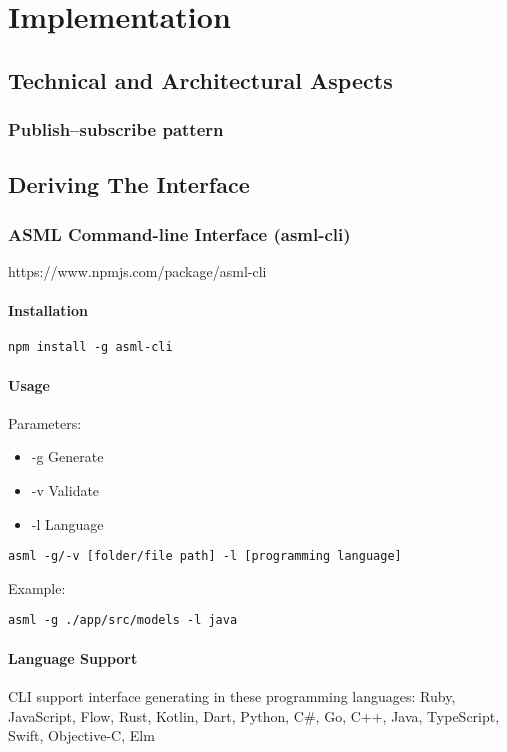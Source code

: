 \chapter{Implementation}
\label{ch:implementation}


\section{Technical and Architectural Aspects}
\subsection{Publish–subscribe pattern}

\section{Deriving The Interface}
\subsection{ASML Command-line Interface (asml-cli)}
https://www.npmjs.com/package/asml-cli

\subsubsection{Installation}
\begin{verbatim}
npm install -g asml-cli
\end{verbatim}
\subsubsection{Usage}
Parameters:
\begin{itemize}
\item -g Generate
\item -v Validate
\item -l Language
\end{itemize}
\begin{verbatim}
asml -g/-v [folder/file path] -l [programming language]
\end{verbatim}
Example:
\begin{verbatim}
asml -g ./app/src/models -l java
\end{verbatim}
\subsubsection{Language Support}
CLI support interface generating in these programming languages:
Ruby, JavaScript, Flow, Rust, Kotlin, Dart, Python, C\#, Go, C++, Java, TypeScript, Swift, Objective-C, Elm
